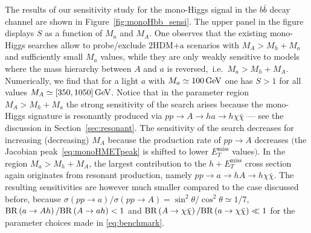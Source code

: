 \documentclass[a4paper, 11pt,notoc]{article}
\newcommand{\MET}{\ensuremath{E_T^\mathrm{miss}}\xspace}
\newcommand{\mA}{\ensuremath{M_{A}}\xspace}
\newcommand{\ma}{\ensuremath{M_{a}}\xspace}
\newcommand{\hdma}{\ensuremath{\textrm{2HDM+a}}\xspace}
\begin{document}
The results of our sensitivity study for the mono-Higgs signal in the $b \bar b$ decay channel are shown in Figure~\ref{fig:monoHbb_sensi}. The upper panel in the figure displays $S$  as a function of $\ma$ and $\mA$. %
One observes that the existing mono-Higgs searches allow to probe/exclude \hdma scenarios with  $\mA > M_h + \ma$  and sufficiently small $\ma$ values, while they are only weakly  sensitive to models where the mass hierarchy between $A$ and $a$ is reversed,~i.e.~$\ma > M_h + \mA$. Numerically, we find that  for  a light $a$ with $\ma \simeq 100 \, {\rm GeV}$ one has $S > 1$ for all values $\mA \simeq [350, 1050] \, {\rm GeV}$. Notice that in the parameter region  $\mA > M_h + \ma$ the strong sensitivity of the search arises because the mono-Higgs signature is resonantly produced via $pp \to A \to ha \to h \chi \bar \chi$ --- see the discussion in Section~\ref{sec:resonant}. The sensitivity of the search decreases for increasing (decreasing) $M_A$ because the production rate of $pp \to A$  decreases $\big($the Jacobian peak~\eqref{eq:monoHMETpeak} is shifted to lower $\MET$ values$\big)$. In the region $\ma > M_h + \mA$, the largest contribution to the $h + \MET$ cross section again originates from resonant production, namely $pp \to a \to hA \to h \chi \bar \chi$.  The resulting sensitivities are however much smaller compared to the case discussed before, because  $\sigma \left (p p \to a \right )/\sigma \left (pp \to A \right ) = \sin^2 \theta/\cos^2 \theta \simeq 1/7$, ${\rm BR} \left ( a \to A h \right )/{\rm BR} \left (  A \to a h  \right ) < 1$ and ${\rm BR} \left ( A \to \chi \bar \chi \right )/{\rm BR} \left (  a \to \chi \bar \chi \right ) \ll~\!\!1$ for the parameter choices made in \eqref{eq:benchmark}. 
\end{document}
